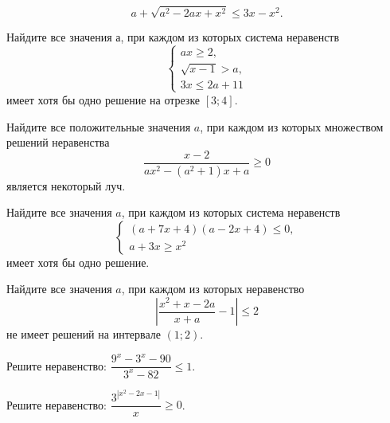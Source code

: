\begin{class}[number=3]
\begin{listofex}
	\[ a + \sqrt{a^2-2ax+x^2}\le3x-x^2. \]
	\item Найдите все значения \( а \), при каждом из которых система неравенств
	\[ \left\{
	\begin{array}{l}
		ax\ge2,\\
		\sqrt{x-1}>a,\\
		3x\le2a+11
	\end{array}
	\right. \]
	имеет хотя бы одно решение на отрезке \( [3;4] \).
	\item Найдите все положительные значения \( a \), при каждом из которых множеством решений неравенства
	\[ \dfrac{x-2}{ax^2-(a^2+1)x+a}\ge0 \]
	является некоторый луч.
	\end{listofex}
\end{class}

\begin{class}[number=4]
	\begin{listofex}
		\item Найдите все значения \( a \), при каждом из которых система неравенств
		\[ \left\{
		\begin{array}{l}
			(a+7x+4)(a-2x+4)\le0,\\
			a+3x\ge x^2
		\end{array}
		\right. \]
		имеет хотя бы одно решение.
		\item Найдите все значения \( a \), при каждом из которых неравенство
		\[ \left|\dfrac{x^2+x-2a}{x+a}-1\right|\le2 \]
		не имеет решений на интервале \( (1;2) \).
		\item Решите неравенство: \( \dfrac{9^x-3^x-90}{3^x-82}\le1 \).
		\item Решите неравенство: \( \dfrac{3^{|x^2-2x-1|}}{x}\ge0 \).
	\end{listofex}
\end{class}

